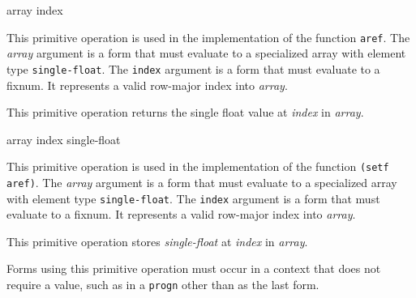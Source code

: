  {array index}

This primitive operation is used in the implementation of the
\commonlisp{} function \texttt{aref}.  The \textit{array} argument is
a form that must evaluate to a specialized array with element type
\texttt{single-float}.  The \texttt{index} argument is a form that
must evaluate to a fixnum.  It represents a valid row-major index into
\textit{array}.

This primitive operation returns the single float value at
\textit{index} in \textit{array}.

 {array index single-float}

This primitive operation is used in the implementation of the
\commonlisp{} function \texttt{(setf aref)}.  The \textit{array}
argument is a form that must evaluate to a specialized array with
element type \texttt{single-float}.  The \texttt{index} argument is a
form that must evaluate to a fixnum.  It represents a valid row-major
index into \textit{array}.

This primitive operation stores \textit{single-float} at
\textit{index} in \textit{array}.

Forms using this primitive operation must occur in a context that does
not require a value, such as in a \texttt{progn} other than as the
last form.
